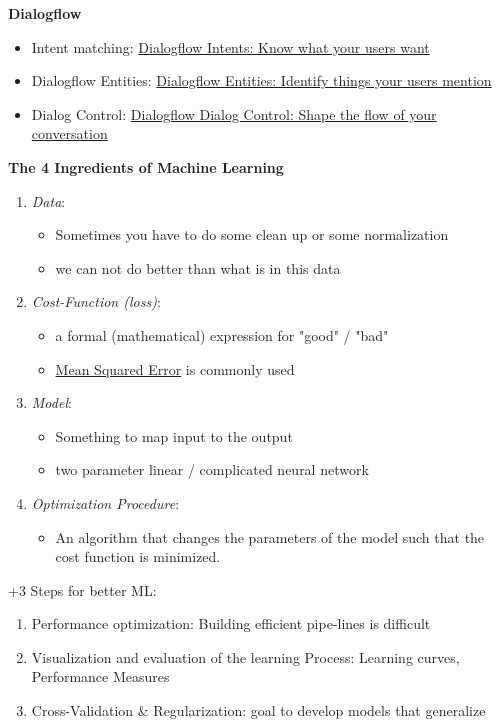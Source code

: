 \documentclass[11pt,landscape]{article}
\begin{document}
\begin{multicols}{3}
\textbf{Dialogflow}

\begin{itemize}
\item Intent matching: \href{https://www.youtube.com/watch?v=9aHusGxntPw}{Dialogflow Intents: Know what your users want}
\item Dialogflow Entities: \href{https://www.youtube.com/watch?v=kzdL6GxJ\_WY}{Dialogflow Entities: Identify things your users mention}
\item Dialog Control: \href{https://youtu.be/-tOamKtmxdY}{Dialogflow Dialog Control: Shape the flow of your conversation}
\end{itemize}



\textbf{The 4 Ingredients of Machine Learning}

\begin{enumerate}
\item \emph{Data}:
\begin{itemize}
\item Sometimes you have to do some clean up or some normalization
\item we can not do better than what is in this data
\end{itemize}
\item \emph{Cost-Function (loss)}:
\begin{itemize}
\item a formal (mathematical) expression for "good" / "bad"
\item \href{../../../roam/20211004175550-mean_squared_error.org}{Mean Squared Error} is commonly used
\end{itemize}
\item \emph{Model}:
\begin{itemize}
\item Something to map input to the output
\item two parameter linear / complicated neural network
\end{itemize}
\item \emph{Optimization Procedure}:
\begin{itemize}
\item An algorithm that changes the parameters of the model such that the cost function is minimized.
\end{itemize}
\end{enumerate}

+3 Steps for better ML:
\begin{enumerate}
\item Performance optimization: Building efficient pipe-lines is difficult
\item Visualization and evaluation of the learning Process: Learning curves, Performance Measures
\item Cross-Validation \& Regularization: goal to develop models that generalize
\end{enumerate}


\end{multicols}
\end{document}
